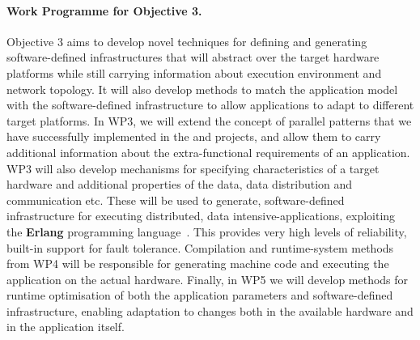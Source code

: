 \documentclass[a4paper,11pt]{article}
\begin{document}
\paragraph*{Work Programme for Objective 3.}
 Objective 3 aims to develop novel techniques for defining and generating software-defined infrastructures that
 will abstract over the target hardware platforms while still carrying information about execution environment
 and network topology.  It will also develop methods to match the application model with the software-defined infrastructure 
 to allow  applications to adapt to different target platforms. In WP3, we will extend the concept of
 parallel patterns that we have successfully implemented in the \paraphrase and \rephrase
 projects, and allow them to carry additional information about the extra-functional requirements of an application.
  WP3 will also develop mechanisms for specifying characteristics of a target hardware and
 additional properties of the data, data distribution and communication etc.
 These will be used to generate, software-defined infrastructure for executing distributed,
 data intensive-applications,  exploiting the \textbf{Erlang} programming language~\cite{Cesarini:2009}.
 This  provides very high levels of reliability, built-in support for fault tolerance. 
 Compilation and runtime-system methods from WP4 will be responsible for generating
 machine code and executing the application 
 on the actual 
 hardware. Finally, in WP5 we will develop methods for runtime optimisation of both the application 
 parameters and software-defined infrastructure, enabling adaptation to changes both in the available hardware and in the
 application itself.
 
 
\end{document}
